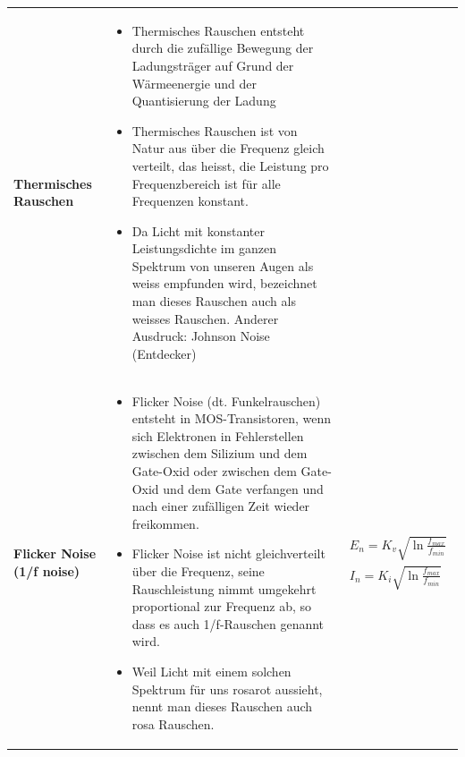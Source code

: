 \begin{longtable}{|l|l|l|}
\begin{minipage}{8cm}
\end{minipage}
\\
\hline
\begin{minipage}{4cm}
\textbf{Thermisches Rauschen}
\end{minipage}
&
\begin{minipage}{6cm}
\begin{itemize}
  \item Thermisches Rauschen entsteht durch die zufällige Bewegung der
  Ladungsträger auf Grund der Wärmeenergie und der Quantisierung der Ladung
  \item Thermisches Rauschen ist von Natur aus über die Frequenz gleich
  verteilt, das heisst, die Leistung pro Frequenzbereich ist für alle Frequenzen konstant.
  \item Da Licht mit konstanter Leistungsdichte im ganzen Spektrum von unseren
  Augen als weiss empfunden wird, bezeichnet man dieses Rauschen auch als weisses Rauschen. Anderer Ausdruck: Johnson Noise (Entdecker)
\end{itemize}
\end{minipage}
&
\\
\hline
\begin{minipage}{4cm}
\textbf{Flicker Noise (1/f noise)}
\end{minipage}
&
\begin{minipage}{6cm}
\begin{itemize}
  \item Flicker Noise (dt. Funkelrauschen) entsteht in MOS-Transistoren, wenn
  sich Elektronen in Fehlerstellen zwischen dem Silizium und dem Gate-Oxid oder
  zwischen dem Gate-Oxid und dem Gate verfangen und nach einer zufälligen Zeit
  wieder freikommen.
  \item Flicker Noise ist nicht gleichverteilt über die Frequenz, seine
  Rauschleistung nimmt umgekehrt proportional zur Frequenz ab, so dass es auch 1/f-Rauschen genannt wird.
  \item Weil Licht mit einem solchen Spektrum für uns rosarot aussieht, nennt
  man dieses Rauschen auch rosa Rauschen.
\end{itemize}
\end{minipage}
&
\begin{minipage}{8cm}
\begin{gather}
E_{n}=K_{v}\sqrt{\ln{\frac{f_{max}}{f_{min}}}}\\
I_{n}=K_{i}\sqrt{\ln{\frac{f_{max}}{f_{min}}}}
\end{gather}
\end{minipage}
\\

\end{longtable}
